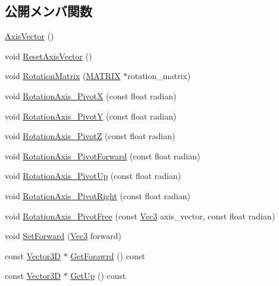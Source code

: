 \subsection*{公開メンバ関数}
\begin{DoxyCompactItemize}
\item 
\mbox{\hyperlink{class_axis_vector_ae77a05cd990defedbd04914dba1f2326}{Axis\+Vector}} ()
\item 
void \mbox{\hyperlink{class_axis_vector_a1414c1390a31d9e98c26d9803c61d2b8}{Reset\+Axis\+Vector}} ()
\item 
void \mbox{\hyperlink{class_axis_vector_a33aab769ff2de997393c13414fa23873}{Rotation\+Matrix}} (\mbox{\hyperlink{_vector3_d_8h_a032295cd9fb1b711757c90667278e744}{M\+A\+T\+R\+IX}} $\ast$rotation\+\_\+matrix)
\item 
void \mbox{\hyperlink{class_axis_vector_ad3110d0a45e303109caa1e0dfb2ca027}{Rotation\+Axis\+\_\+\+PivotX}} (const float radian)
\item 
void \mbox{\hyperlink{class_axis_vector_aee4198c9fcf78d6912b129e2210a58fa}{Rotation\+Axis\+\_\+\+PivotY}} (const float radian)
\item 
void \mbox{\hyperlink{class_axis_vector_adde5b636a046a4fe6c5c943646045843}{Rotation\+Axis\+\_\+\+PivotZ}} (const float radian)
\item 
void \mbox{\hyperlink{class_axis_vector_a42872a62f656e7249af84e39fd519475}{Rotation\+Axis\+\_\+\+Pivot\+Forward}} (const float radian)
\item 
void \mbox{\hyperlink{class_axis_vector_ad33eef7f1b3912b6a1d0eaa18fff8f29}{Rotation\+Axis\+\_\+\+Pivot\+Up}} (const float radian)
\item 
void \mbox{\hyperlink{class_axis_vector_a71a7638817a488d824cdc757d4e28a0c}{Rotation\+Axis\+\_\+\+Pivot\+Right}} (const float radian)
\item 
void \mbox{\hyperlink{class_axis_vector_a7cab74dd54bf4fc97770aee2278f2fa4}{Rotation\+Axis\+\_\+\+Pivot\+Free}} (const \mbox{\hyperlink{_vector3_d_8h_ab16f59e4393f29a01ec8b9bbbabbe65d}{Vec3}} axis\+\_\+vector, const float radian)
\item 
void \mbox{\hyperlink{class_axis_vector_ac429404c0b565c24307da4442e49bb61}{Set\+Forward}} (\mbox{\hyperlink{_vector3_d_8h_ab16f59e4393f29a01ec8b9bbbabbe65d}{Vec3}} forward)
\item 
const \mbox{\hyperlink{class_vector3_d}{Vector3D}} $\ast$ \mbox{\hyperlink{class_axis_vector_a79013d5b090ce9232d57f528f18e982e}{Get\+Forawrd}} () const
\item 
const \mbox{\hyperlink{class_vector3_d}{Vector3D}} $\ast$ \mbox{\hyperlink{class_axis_vector_aba45ae6f91ac516e6e42fdb8bcfcae2e}{Get\+Up}} () const

\end{DoxyCompactItemize}
